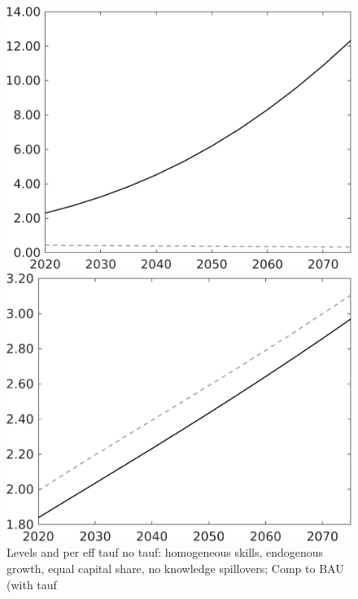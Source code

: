\documentclass[12pt]{article}
\begin{document}
\begin{figure}
	\centering
	\caption{Levels and per eff tauf no tauf: homogeneous skills, endogenous growth, equal capital share, no knowledge spillovers; Comp to BAU (with tauf}\label{fig:Leveltauf_nsk1_xgr0_equalcapShare_noknow_withtaul2}
	
	\begin{minipage}[]{0.32\textwidth}
		\includegraphics[width=1\textwidth]{../../codding_model/own_basedOnFried/optimalPol_010922_revision/figures/all_13Sept22/LevTaufNoTauf_TaulCalib_Equlab_regime0_LgLf_spillover0_nsk1_xgr0_knspil1_sep1_LFlimit0_emsbase0_countec0_GovRev0_etaa0.79_lgd0.png}
	\end{minipage}	
	\begin{minipage}[]{0.32\textwidth}
		\includegraphics[width=1\textwidth]{../../codding_model/own_basedOnFried/optimalPol_010922_revision/figures/all_13Sept22/LevTaufNoTauf_TaulCalib_Equlab_regime0_N_spillover0_nsk1_xgr0_knspil1_sep1_LFlimit0_emsbase0_countec0_GovRev0_etaa0.79_lgd0.png}

\end{minipage}
\end{figure}
\end{document}
